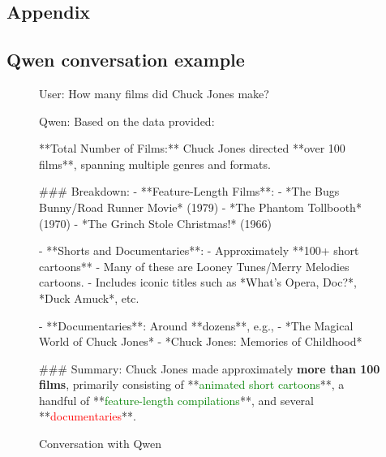 \documentclass[fleqn,moreauthors,10pt]{ds_report}
\newcommand{\red}[1]{\textcolor{red}{#1}}
\newcommand{\green}[1]{\textcolor{green}{#1}}
\begin{document}
\newpage
\begin{appendix}

\section*{Appendix}
\label{append}

\subsection*{Qwen conversation example}

\begin{figure}
\begin{tcolorbox}
User: How many films did Chuck Jones make?

Qwen: Based on the data provided:

	**Total Number of Films:**  
	Chuck Jones directed **over 100 films**, spanning multiple genres and formats.

	\#\#\# Breakdown:
	- **Feature-Length Films**: 
    		- *The Bugs Bunny/Road Runner Movie* (1979)
	    - *The Phantom Tollbooth* (1970)
	    - *The Grinch Stole Christmas!* (1966)

	- **Shorts and Documentaries**:
	    - Approximately **100+ short cartoons**
	        - Many of these are Looney Tunes/Merry Melodies cartoons.
	        - Includes iconic titles such as *What's Opera, Doc?*, *Duck Amuck*, etc.
    
	    - **Documentaries**: Around **dozens**, e.g.,
	    	    - *The Magical World of Chuck Jones*
	        - *Chuck Jones: Memories of Childhood*

	\#\#\# Summary:
	Chuck Jones made approximately \textbf{more than 100 films}, primarily consisting of **\green{animated short cartoons}**, a handful of **\green{feature-length compilations}**, and several **\red{documentaries}**.
\end{tcolorbox}
\caption{Conversation with Qwen}
\label{qwenconvo}
\end{figure}


 


\end{appendix}
\end{document}
